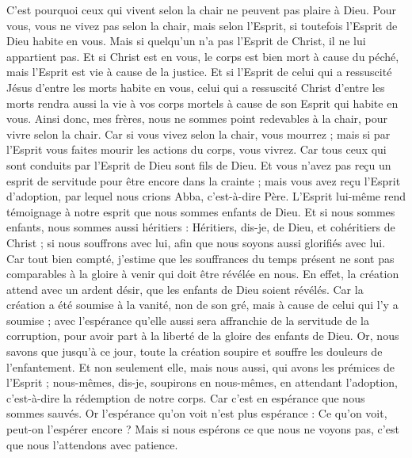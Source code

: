 \begin{multicols}{2}
C'est pourquoi ceux qui vivent selon la chair ne peuvent pas plaire à Dieu.
Pour vous, vous ne vivez pas selon la chair, mais selon l'Esprit, si toutefois l'Esprit de Dieu habite en vous. Mais si quelqu'un n'a pas l'Esprit de Christ, il ne lui appartient pas.
Et si Christ est en vous, le corps est bien mort à cause du péché, mais l'Esprit est vie à cause de la justice.
Et si l'Esprit de celui qui a ressuscité Jésus d'entre les morts habite en vous, celui qui a ressuscité Christ d'entre les morts rendra aussi la vie à vos corps mortels à cause de son Esprit qui habite en vous.
Ainsi donc, mes frères, nous ne sommes point redevables à la chair, pour vivre selon la chair.
Car si vous vivez selon la chair, vous mourrez ; mais si par l'Esprit vous faites mourir les actions du corps, vous vivrez.
Car tous ceux qui sont conduits par l'Esprit de Dieu sont fils de Dieu.
Et vous n'avez pas reçu un esprit de servitude pour être encore dans la crainte ; mais vous avez reçu l'Esprit d'adoption, par lequel nous crions Abba, c'est-à-dire Père.
L'Esprit lui-même rend témoignage à notre esprit que nous sommes enfants de Dieu.
Et si nous sommes enfants, nous sommes aussi héritiers : Héritiers, dis-je, de Dieu, et cohéritiers de Christ ; si nous souffrons avec lui, afin que nous soyons aussi glorifiés avec lui.
Car tout bien compté, j'estime que les souffrances du temps présent ne sont pas comparables à la gloire à venir qui doit être révélée en nous.
En effet, la création attend avec un ardent désir, que les enfants de Dieu soient révélés.
Car la création a été soumise à la vanité, non de son gré, mais à cause de celui qui l'y a soumise ;
avec l'espérance qu'elle aussi sera affranchie de la servitude de la corruption, pour avoir part à la liberté de la gloire des enfants de Dieu.
Or, nous savons que jusqu'à ce jour, toute la création soupire et souffre les douleurs de l'enfantement.
Et non seulement elle, mais nous aussi, qui avons les prémices de l'Esprit ; nous-mêmes, dis-je, soupirons en nous-mêmes, en attendant l'adoption, c'est-à-dire la rédemption de notre corps.
Car c'est en espérance que nous sommes sauvés. Or l'espérance qu'on voit n'est plus espérance : Ce qu'on voit, peut-on l'espérer encore ?
Mais si nous espérons ce que nous ne voyons pas, c'est que nous l'attendons avec patience.

\end{multicols}
